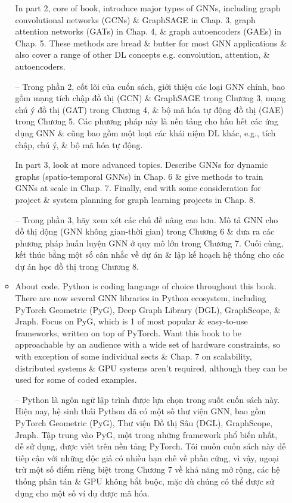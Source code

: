 \documentclass{article}
\begin{document}
\begin{itemize}
\begin{itemize}
        In part 2, core of book, introduce major types of GNNs, including graph convolutional networks (GCNs) \& GraphSAGE in Chap. 3, graph attention networks (GATs) in Chap. 4, \& graph autoencoders (GAEs) in Chap. 5. These methods are bread \& butter for most GNN applications \& also cover a range of other DL concepts e.g. convolution, attention, \& autoencoders.

        -- Trong phần 2, cốt lõi của cuốn sách, giới thiệu các loại GNN chính, bao gồm mạng tích chập đồ thị (GCN) \& GraphSAGE trong Chương 3, mạng chú ý đồ thị (GAT) trong Chương 4, \& bộ mã hóa tự động đồ thị (GAE) trong Chương 5. Các phương pháp này là nền tảng cho hầu hết các ứng dụng GNN \& cũng bao gồm một loạt các khái niệm DL khác, e.g., tích chập, chú ý, \& bộ mã hóa tự động.

        In part 3, look at more advanced topics. Describe GNNs for dynamic graphs (spatio-temporal GNNs) in Chap. 6 \& give methods to train GNNs at scale in Chap. 7. Finally, end with some consideration for project \& system planning for graph learning projects in Chap. 8.

        -- Trong phần 3, hãy xem xét các chủ đề nâng cao hơn. Mô tả GNN cho đồ thị động (GNN không gian-thời gian) trong Chương 6 \& đưa ra các phương pháp huấn luyện GNN ở quy mô lớn trong Chương 7. Cuối cùng, kết thúc bằng một số cân nhắc về dự án \& lập kế hoạch hệ thống cho các dự án học đồ thị trong Chương 8.
        \item {\sf About code.} Python is coding language of choice throughout this book. There are now several GNN libraries in Python ecosystem, including PyTorch Geometric (PyG), Deep Graph Library (DGL), GraphScope, \& Jraph. Focus on PyG, which is 1 of most popular \& easy-to-use frameworks, written on top of PyTorch. Want this book to be approachable by an audience with a wide set of hardware constraints, so with exception of some individual sects \& Chap. 7 on scalability, distributed systems \& GPU systems aren't required, although they can be used for some of coded examples.

        -- Python là ngôn ngữ lập trình được lựa chọn trong suốt cuốn sách này. Hiện nay, hệ sinh thái Python đã có một số thư viện GNN, bao gồm PyTorch Geometric (PyG), Thư viện Đồ thị Sâu (DGL), GraphScope, Jraph. Tập trung vào PyG, một trong những framework phổ biến nhất, dễ sử dụng, được viết trên nền tảng PyTorch. Tôi muốn cuốn sách này dễ tiếp cận với những độc giả có nhiều hạn chế về phần cứng, vì vậy, ngoại trừ một số điểm riêng biệt trong Chương 7 về khả năng mở rộng, các hệ thống phân tán \& GPU không bắt buộc, mặc dù chúng có thể được sử dụng cho một số ví dụ được mã hóa.


\end{itemize}
\end{itemize}
\end{document}

